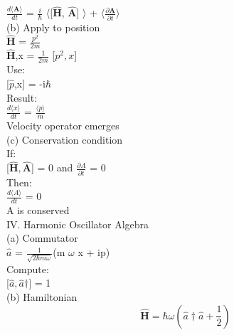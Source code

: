 \documentclass[a4paper, 10pt, onepage]{elegantbook}
\begin{document}
{$\frac{d \langle \mathbf A \rangle}{dt}$ = $\frac{i}{\hbar}$ $\langle$[$\mathbf {\hat H}$, $\mathbf {\hat A}$] $\rangle$ + $\langle \frac{\partial \mathbf A}{\partial t} \rangle$  \\  
                              
    
 (b) Apply to position \\  

$\mathbf {\hat H}$ = $\frac{p^2}{2m}$ \\
 
$\mathbf{\hat  H}$,x = $\frac{1}{2m}$ [$p^2,x]$  \\ 

Use:  \\
  
    [$\hat p$,x] = -i$\hbar$  \\
    
Result:  \\

    $\frac{d \langle x \rangle}{dt}$ = $\frac{\langle p \rangle}{m}$ \\
 
    Velocity operator emerges  \\ 
    
(c) Conservation condition \\ 

If: \\
 
    [$\mathbf {\hat H}, \mathbf {\hat A}$] = 0 and $\frac{\partial A}{\partial t}$ = 0 \\
 
    Then: \\
 
        $\frac{d \langle A \rangle}{dt}$ = 0 \\
 
        A is conserved  \\

IV. Harmonic Oscillator Algebra \\ 

(a) Commutator  \\
  
$\hat a$ = $\frac{1}{\sqrt{2 \hbar {m} \omega}}$(m $\omega$ x + ip)  \\  

Compute: \\
 
    [$\hat a, \hat a{\dagger}]$ = 1 \\ 
    
(b) Hamiltonian
\begin{equation} \label{eq:Hamiltonian}
\mathbf{\hat H} = \hbar \omega (\hat a{\dagger} \hat a + \frac{1}{2})
\end{equation}

}
\end{document}
